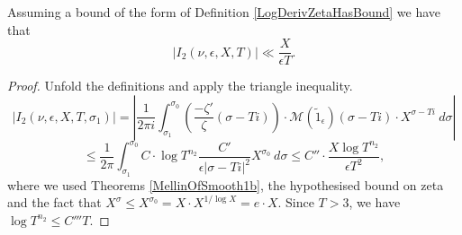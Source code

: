 \begin{lemma}[I2GenBound]
\label{I2GenBound}
\leanok
Assuming a bound of the form of Definition \ref{LogDerivZetaHasBound} we have that
  $$
  \left|I_2(\nu,\epsilon,X,T)\right|\ll\frac{X}{\epsilon T}.
  $$
\end{lemma}
\begin{proof}
\leanok
Unfold the definitions and apply the triangle inequality.
  $$
  \left|I_2(\nu, \epsilon, X, T, \sigma_1)\right|=
  \left|\frac{1}{2\pi i}\int_{\sigma_1}^{\sigma_0}
  \left(\frac{-\zeta'}\zeta(\sigma - T i) \right) \cdot
  \mathcal M(\widetilde 1_\epsilon)(\sigma - T i) \cdot
  X^{\sigma - T i}
   \ d\sigma
  \right|
  $$
  $$\leq
  \frac{1}{2\pi}
  \int_{\sigma_1}^{\sigma_0}
  C \cdot \log T ^{n_2}
  \frac{C'}{\epsilon|\sigma - T i|^2}
  X^{\sigma_0}
   \ d\sigma
   \leq
  C'' \cdot \frac{X\log T^{n_2}}{\epsilon T^2}
  ,
  $$
  where we used Theorems \ref{MellinOfSmooth1b}, the hypothesised bound on zeta and the fact that
  $X^\sigma \le X^{\sigma_0} = X\cdot X^{1/\log X}=e \cdot X$.
  Since $T>3$, we have $\log T^{n_2} \leq C''' T$.
\end{proof}
